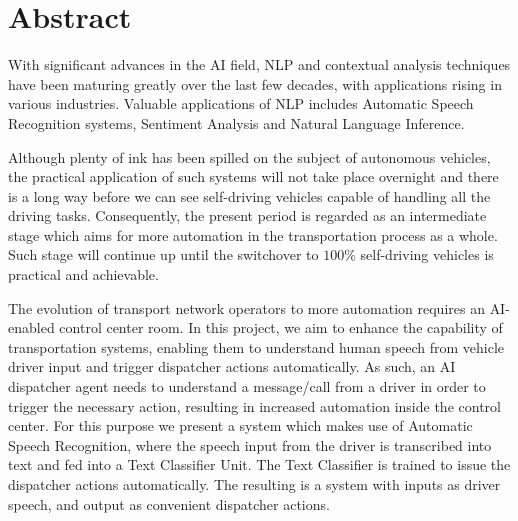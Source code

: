 \chapter*{Abstract}
\label{chap:abstract}
With significant advances in the \ac{AI} field, \ac{NLP} and contextual analysis techniques have been maturing greatly over the last few decades, with applications rising in various industries. Valuable applications of \ac{NLP} includes Automatic Speech Recognition systems, Sentiment Analysis and Natural Language Inference.

Although plenty of ink has been spilled on the subject of autonomous vehicles, the practical application of such systems will not take place overnight and there is a long way before we can see self-driving vehicles capable of handling all the driving tasks. Consequently, the present period is regarded as an intermediate stage which aims for more automation in the transportation process as a whole. Such stage will continue up until the switchover to $100\%$ self-driving vehicles is practical and achievable. 

The evolution of transport network operators to more automation requires an \ac{AI}-enabled control center room. In this project, we aim to enhance the capability of transportation systems, enabling them to understand human speech from vehicle driver input and trigger dispatcher actions automatically. As such, an \ac{AI} dispatcher agent needs to understand a message/call from a driver in order to trigger the necessary action, resulting in increased automation inside the control center. For this purpose we present a system which makes use of Automatic Speech Recognition, where the speech input from the driver is transcribed into text and fed into a Text Classifier Unit. The Text Classifier is trained to issue the dispatcher actions automatically. The resulting is a system with inputs as driver speech, and output as convenient dispatcher actions.
